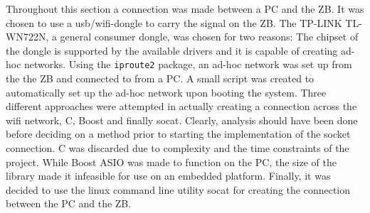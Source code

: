 Throughout this section a connection was made between a PC and the ZB.
It was chosen to use a usb/wifi-dongle to carry the signal on the ZB.
The TP-LINK TL-WN722N, a general consumer dongle, was chosen for two reasons: The chipset of the dongle is supported by the available drivers and it is capable of creating ad-hoc networks.
Using the \texttt{iproute2} package, an ad-hoc network was set up from the the ZB and connected to from a PC.
A small script was created to automatically set up the ad-hoc network upon booting the system.
Three different approaches were attempted in actually creating a connection across the wifi network, C, Boost and finally socat.
Clearly, analysis should have been done before deciding on a method prior to starting the implementation of the socket connection.
C was discarded due to complexity and the time constraints of the project.
While Boost ASIO was made to function on the PC, the size of the library made it infeasible for use on an embedded platform.
Finally, it was decided to use the linux command line utility socat for creating the connection between the PC and the ZB.